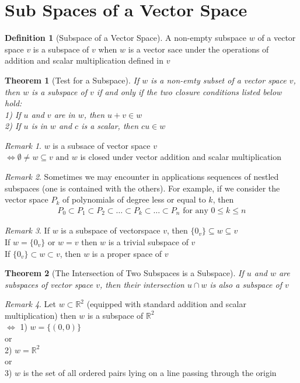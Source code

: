 \documentclass{jhwhw}
\newtheorem{theorem}{Theorem}
\theoremstyle{definition}
\newtheorem{definition}{Definition}
\theoremstyle{remark}
\newtheorem*{remark}{Remark}
\theoremstyle{example}
\begin{document}
\section{Sub Spaces of a Vector Space}
\begin{definition}[Subspace of a Vector Space] A non-empty subspace \(w\) of a vector space \(v\) is a subspace of \(v\) when \(w\) is a vector sace under the operations
of addition and scalar multiplication defined in \(v\) \end{definition}
\begin{theorem}[Test for a Subspace] If \(w\) is a non-emty subset of a vector space \(v\), then \(w\) is a subspace of \(v\) if and only if the two closure conditions
listed below hold:\\
1) If \(u\) and \(v\) are in \(w\), then \(u+v \in w\)\\
2) If \(u\) is in \(w\) and \(c\) is a scalar, then \(cu \in w\) \end{theorem}
\begin{remark} \(w\) is a subsace of vector space \(v\)\\
\(\Leftrightarrow \emptyset \neq w \subseteq v \text{ and } w\) is closed under vector addition and scalar multiplication \end{remark}
\begin{remark} Sometimes we may encounter in applications sequences of nestled subspaces (one is contained with the others). For example, if we consider the vector space \(P_k\)
of polynomials of degree less or equal to \(k\), then
\begin{align*} P_0 \subset P_1 \subset P_2 \subset \ldots \subset P_k \subset \ldots \subset P_n \text{ for any } 0 \leq k \leq n\end{align*} \end{remark}
\begin{remark} If \(w\) is a subspace of vectorspace \(v\), then \(\{ 0_v\} \subseteq w \subseteq v\) \\
If \(w = \{0_v\}\) or \(w=v\) then \(w\) is a trivial subspace of \(v\)\\
If \(\{0_v\} \subset w \subset v\), then \(w\) is a proper space of \(v\) \end{remark}
\begin{theorem}[The Intersection of Two Subspaces is a Subspace] If \(u\) and \(w\) are subspaces of vector space \(v\), then their intersection
\(u \cap w\) is also a subspace of \(v\)  \end{theorem}
\begin{remark} Let \(w \subset \mathbb{R}^2\) (equipped with standard addition and scalar multiplication) then \(w\) is a subspace of \(\mathbb{R}^2\)\\
\(\Leftrightarrow\) 1) \(w = \{(0,0)\}\)\\
or\\
2) \(w = \mathbb{R}^2\)\\
or\\
3) \(w\) is the set of all ordered pairs lying on a line passing through the origin \end{remark}
\end{document}
